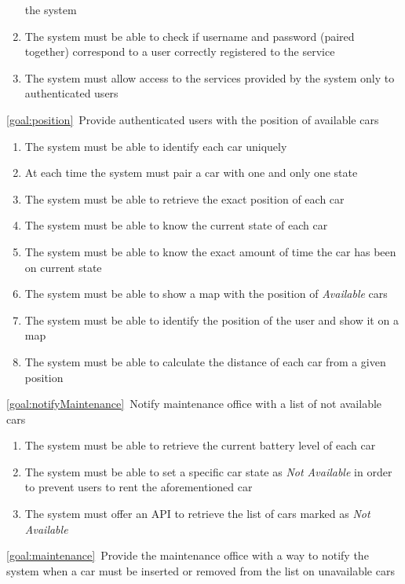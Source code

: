 \begin{description}
\begin{enumerate}[resume*]
  				the system
   				\item The system must be able to check if username and password (paired together)
   				correspond to a user correctly registered to the service
   				\item The system must allow access to the services provided by the system only to
   				authenticated users 
			\end{enumerate}
		\item \ref{goal:position}\ Provide authenticated users with the position of available cars
			\begin{enumerate}[resume*]
				\item The system must be able to identify each car uniquely
			 	\item At each time the system must pair a car with one and only one state
  				\item The system must be able to retrieve the exact position of each car
   				\item The system must be able to know the current state of each car
   				\item The system must be able to know the exact amount of time the car has been on
   				current state
   				\item The system must be able to show a map with the position of \emph{Available} cars
  				\item The system must be able to identify the position of the user and show it on a map
   				\item The system must be able to calculate the distance of each car from a given position
  			\end{enumerate}
		\item \ref{goal:notifyMaintenance}\ Notify maintenance office with a list of not available cars
			\begin{enumerate}[resume*]
   				\item The system must be able to retrieve the current battery level of each car
   				\item The system must be able to set a specific car state as \emph{Not Available} in order
   				to prevent users to rent the aforementioned car
   				\item The system must offer an API to retrieve the list of cars marked as \emph{Not
   				Available}
  			\end{enumerate}
		\item \ref{goal:maintenance}\ Provide the maintenance office with a way to notify the system
		when a car must be inserted or removed from the list on unavailable cars

\end{description}
